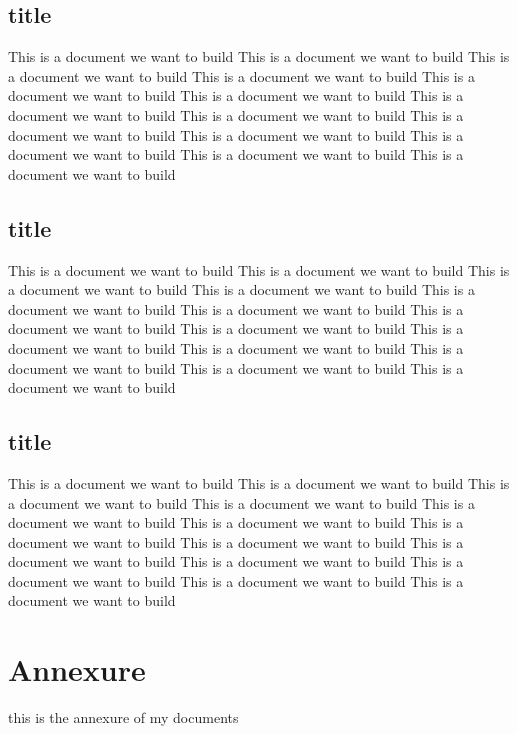 \documentclass{book}
\begin{document}
	\section{title}
	This is a document we want to build	This is a document we want to build	This is a document we want to build	
	This is a document we want to build	
	This is a document we want to build	This is a document we want to build	This is a document we want to build	This is a document we want to build	
	This is a document we want to build	
	This is a document we want to build	
	This is a document we want to build	
	This is a document we want to build	
	This is a document we want to build
	
	\section{title}
	This is a document we want to build	This is a document we want to build	This is a document we want to build	
	This is a document we want to build	
	This is a document we want to build	This is a document we want to build	This is a document we want to build	This is a document we want to build	
	This is a document we want to build	
	This is a document we want to build	
	This is a document we want to build	
	This is a document we want to build	
	This is a document we want to build
	\section{title}
	This is a document we want to build	This is a document we want to build	This is a document we want to build	
	This is a document we want to build	
	This is a document we want to build	This is a document we want to build	This is a document we want to build	This is a document we want to build	
	This is a document we want to build	
	This is a document we want to build	
	This is a document we want to build	
	This is a document we want to build	
	This is a document we want to build
	
	\chapter{Annexure}
	\setcounter{page}{1}
	
	this is the annexure of my documents
\end{document}
